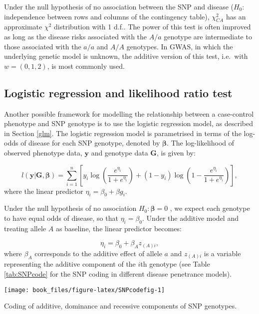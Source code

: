 \documentclass[]{book}
\begin{document}
Under the null hypothesis of no association between the SNP and disease
(\(H_0:\) independence between rows and columns of the contingency table),
\(\chi^2_{CA}\) has an approximate \(\chi^2\) distribution with 1 d.f.. The
power of this test is often improved as long as the disease risks
associated with the \(A/a\) genotype are intermediate to those associated
with the \(a/a\) and \(A/A\) genotypes. In GWAS, in which the underlying
genetic model is unknown, the additive version of this test, i.e.~with
\(w = (0,1,2)\), is most commonly used.

\hypertarget{logitGWAS}{%
\subsection{Logistic regression and likelihood ratio test}\label{logitGWAS}}

Another possible framework for modelling the relationship between a
case-control phenotype and SNP genotype is to use the logistic
regression model, as described in Section \ref{glm}. The logistic
regression model is parametrised in terms of the log-odds of disease for
each SNP genotype, denoted by \(\boldsymbol{\beta}\). The log-likelihood of observed
phenotype data, \(\mathbf{y}\) and genotype data \(\mathbf{G}\), is given by:

\[l(\mathbf{y} | \mathbf{G},\boldsymbol{\beta}) = \sum_{i=1}^n \left[ y_i \log \left( \frac{e^{\eta_i}}{1+e^{\eta_i}}\right) +  (1-y_i)\log \left( 1 - \frac{e^{\eta_i}}{1+e^{\eta_i}} \right) \right],\]
where the linear predictor \(\eta_i = \beta_0 + \beta g_i\).

Under the null hypothesis of no association \(H_0: \boldsymbol{\beta} = 0\) , we
expect each genotype to have equal odds of disease, so that
\(\eta_i = \beta_0\). Under the additive model and treating allele \(A\) as
baseline, the linear predictor becomes:

\[\eta_i = \beta_0 + \beta_A z_{(A)i},\] where \(\beta_A\) corresponds to
the additive effect of allele \(a\) and \(z_{(A)i}\) is a variable
representing the additive component of the \(i\)th genotype (see Table
\ref{tab:SNPcode} for the SNP coding in different disease penetrance
models).

\begin{center}\texttt{[image: book\_files/figure-latex/SNPcodefig-1]} \end{center}

\label{tab:SNPcode}Coding of additive, dominance and recessive components of SNP genotypes.
\end{document}
